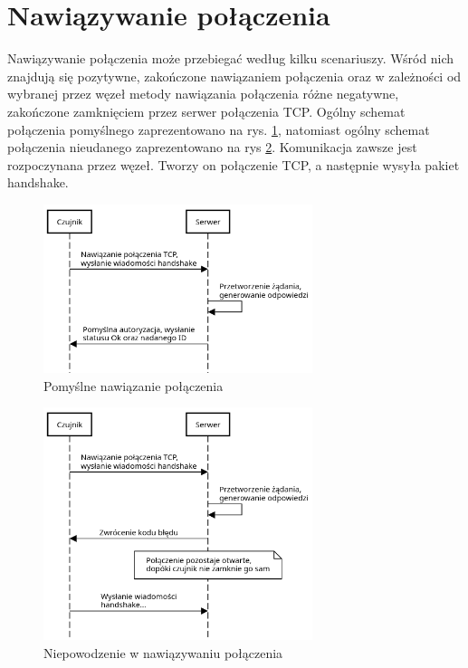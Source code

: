 \documentclass[12pt,oneside,a4paper]{book}
\theoremstyle{break}
\begin{document}
\section{Nawiązywanie połączenia}
Nawiązywanie połączenia może przebiegać według kilku scenariuszy. Wśród nich
znajdują się pozytywne, zakończone nawiązaniem połączenia oraz w zależności
od wybranej przez węzeł metody nawiązania połączenia różne negatywne,
zakończone zamknięciem przez serwer połączenia TCP. Ogólny schemat połączenia
pomyślnego zaprezentowano na rys. \ref{rys:conn-happy-path}, natomiast 
ogólny schemat połączenia nieudanego zaprezentowano na rys \ref{rys:conn-sad-path}.
Komunikacja zawsze jest rozpoczynana przez węzeł. Tworzy on połączenie
TCP, a następnie wysyła pakiet handshake. 

\begin{figure}
    \begin{center}
        \includegraphics[width=0.7\textwidth]{handshake_happy_path.png}        
        \caption{Pomyślne nawiązanie połączenia}        
        \label{rys:conn-happy-path}
    \end{center}
\end{figure}

\begin{figure}
    \begin{center}
        \includegraphics[width=0.7\textwidth]{handshake_sad_path.png}        
        \caption{Niepowodzenie w nawiązywaniu połączenia}        
        \label{rys:conn-sad-path}
    \end{center}
\end{figure}
\end{document}
